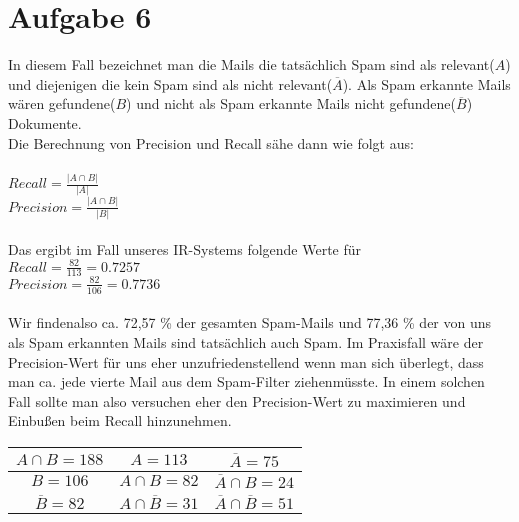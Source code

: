 \section*{Aufgabe 6}
In diesem Fall bezeichnet man die Mails die tatsächlich Spam sind als \glqq relevant\grqq ($ A$) und diejenigen die kein Spam sind als \glqq nicht relevant\grqq ($ \overline{A}$). Als Spam erkannte Mails wären \glqq gefundene\grqq ($ B$) und nicht als Spam erkannte Mails \glqq nicht gefundene\grqq ($ \overline{B}$) Dokumente.\\
Die Berechnung von Precision und Recall sähe dann wie folgt aus:\\
\ \\
$Recall = \frac{|A \cap B|}{|A|} $\\
$Precision = \frac{|A \cap B|}{|B|}$\\
\ \\
Das ergibt im Fall unseres IR-Systems folgende Werte für\\
$Recall = \frac{82}{113} = 0.7257$\\
$Precision = \frac{82}{106} = 0.7736$\\
\ \\
Wir \glqq finden\grqq  also ca. 72,57 \% der gesamten Spam-Mails und 77,36 \% der von uns als Spam erkannten Mails sind tatsächlich auch Spam. Im Praxisfall wäre der Precision-Wert für uns eher unzufriedenstellend wenn man sich überlegt, dass man ca. jede vierte Mail aus dem Spam-Filter \glqq ziehen\grqq  müsste. In einem solchen Fall sollte man also versuchen eher den Precision-Wert zu maximieren und Einbußen beim Recall hinzunehmen.
\ \\
\begin{center}
\begin{tabular}{|S{c}|S{c}|S{c}|}
\hline 
$A \cap B = 188$ & $A = 113 $ & $\overline{A} = 75 $ \\ 
\hline 
$B = 106$ & $A \cap B = 82 $ & $\overline{A} \cap B = 24$ \\ 
\hline 
$\overline{B} = 82$ & $A \cap \overline{B} = 31 $ & $\overline{A} \cap \overline{B} = 51 $ \\ 
\hline 
\end{tabular}
\end{center}
